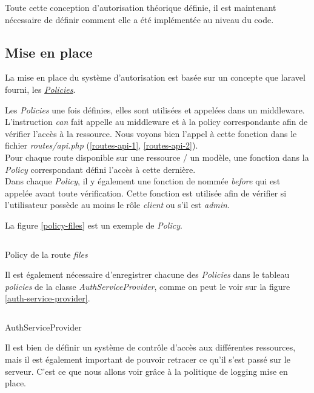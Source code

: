 \documentclass[
    iai, %
    il, %
]{heig-tb}
\begin{document}
Toute cette conception d'autorisation théorique définie, il est maintenant nécessaire de définir comment elle a été implémentée au niveau du code.

\subsection{Mise en place}
La mise en place du système d'autorisation est basée sur un concepte que \Gls{laravel} fourni, les \href{https://laravel.com/docs/9.x/authorization#creating-policies}{\emph{Policies}}.

Les \emph{Policies} une fois définies, elles sont utilisées et appelées dans un middleware. L'instruction \emph{can} fait appelle au middleware et à la policy correspondante afin de vérifier l'accès à la ressource. Nous voyons bien l'appel à cette fonction dans le fichier \emph{routes/api.php} (\ref{routes-api-1}, \ref{routes-api-2}). \\
Pour chaque route disponible sur une ressource / un modèle, une fonction dans la \emph{Policy} correspondant défini l'accès à cette dernière. \\
Dans chaque \emph{Policy}, il y également une fonction de nommée \emph{before} qui est appelée avant toute vérification. Cette fonction est utilisée afin de vérifier si l'utilisateur possède au moins le rôle \emph{client} ou s'il est \emph{admin}.

La figure \ref{policy-files} est un exemple de \emph{Policy}.

\begin{listing}[H]
    \inputminted{php}{assets/code/FilePolicy.php}
    \caption{Policy de la route \emph{files} \label{policy-files}}
\end{listing}

Il est également nécessaire d'enregistrer chacune des \emph{Policies} dans le tableau \emph{policies} de la classe \emph{AuthServiceProvider}, comme on peut le voir sur la figure \ref{auth-service-provider}.

\begin{listing}[H]
    \inputminted{php}{assets/code/AuthServiceProvider.php}
    \caption{AuthServiceProvider \label{auth-service-provider}}
\end{listing}

Il est bien de définir un système de contrôle d'accès aux différentes ressources, mais il est également important de pouvoir retracer ce qu'il s'est passé sur le serveur. C'est ce que nous allons voir grâce à la politique de logging mise en place.
\end{document}
